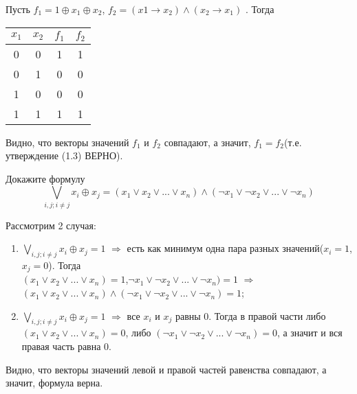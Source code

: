 \begin{solution}
 Пусть $f_1=1\oplus x_1\oplus x_2$, $f_2=(x1\rightarrow x_2)\wedge(x_2\rightarrow x_1)$ . Тогда \\
 
\begin{center}
 \begin{tabular}{| c c | c | c |}
  \hline	
 $ x_1$ & $x_2$ & $f_1$ & $f_2$ \\ [0,5 ex]
  \hline\hline
  0 & 0 & 1 & 1\\ [1,5 ex]
  \hline
  0 & 1 & 0 & 0 \\ [1,5 ex]
  \hline
  1 & 0 & 0 & 0 \\ [1,5 ex]
  \hline
  1 & 1 & 1 & 1 \\ [1,5 ex]
  \hline
 \end{tabular}
 \end{center}
Видно, что векторы значений $f_1$ и $f_2$ совпадают, а значит, $f_1=f_2$(т.е. утверждение (1.3) ВЕРНО).
\end{solution}

\begin{exercise}
Докажите формулу
\begin{equation}
		\bigvee_{i,j;i\neq j} x_i\oplus x_j=(x_1\vee x_2\vee ...\vee x_n)\wedge(\neg x_1\vee \neg x_2\vee ...\vee \neg x_n)
\end{equation}

\end{exercise}

\begin{solution}
Рассмотрим 2 случая: \\
\begin{enumerate}
	\item $\bigvee_{i,j;i\neq j} x_i\oplus x_j=1$ $\Rightarrow$ есть как минимум одна пара разных значений($x_i=1$,$x_j=0$). Тогда\\
$(x_1\vee x_2\vee ...\vee x_n)=1$,$\neg x_1\vee \neg x_2\vee ...\vee \neg x_n)=1$ $\Rightarrow$ $(x_1\vee x_2\vee ...\vee x_n)\wedge(\neg x_1\vee \neg x_2\vee ...\vee \neg x_n)=1$;
	\item $\bigvee_{i,j;i\neq j} x_i\oplus x_j=1$ $\Rightarrow$ все $x_i$ и $x_j$ равны 0. Тогда в правой части либо $(x_1\vee x_2\vee ...\vee x_n)=0$, либо $(\neg x_1\vee \neg x_2\vee ...\vee \neg x_n)=0$, а значит и вся правая часть равна 0.
\end{enumerate}
Видно, что векторы значений левой и правой частей равенства совпадают, а значит, формула верна.

\end{solution}




